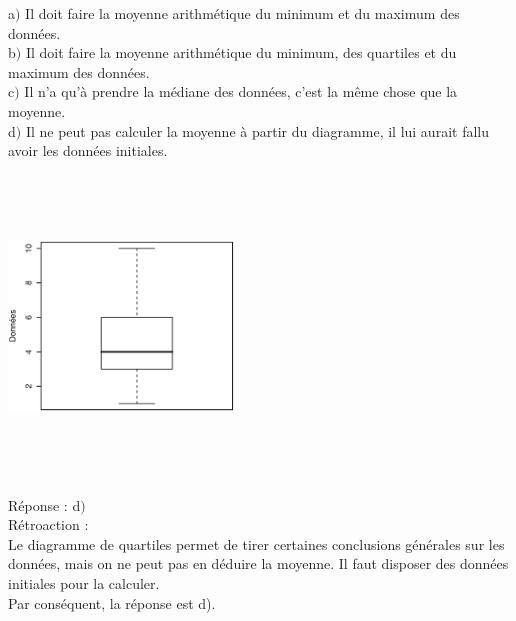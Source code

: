 \documentclass[letterpaper, 12pt]{article}
\begin{document}
a$)$ Il doit faire la moyenne arithm\'etique du minimum et du maximum des donn\'ees. \\
b$)$ Il doit faire la moyenne arithm\'etique du minimum, des quartiles et du maximum des donn\'ees. \\
c$)$ Il n'a qu'\`a prendre la m\'ediane des donn\'ees, c'est la m\^eme chose que la moyenne.\\
d$)$ Il ne peut pas calculer la moyenne \`a partir du diagramme, il lui aurait fallu avoir les donn\'ees initiales.\\
\begin{center}
 \includegraphics[width=6cm,height=8cm,angle=-90]{Q2024.eps}
\end{center}

R\'eponse : d$)$\\

R\'etroaction :\\
Le diagramme de quartiles permet de tirer certaines conclusions g\'en\'erales sur les donn\'ees, mais on ne peut pas en d\'eduire la moyenne. Il faut disposer des donn\'ees initiales pour la calculer.\\
Par cons\'equent, la r\'eponse est d).\\

\end{document}
